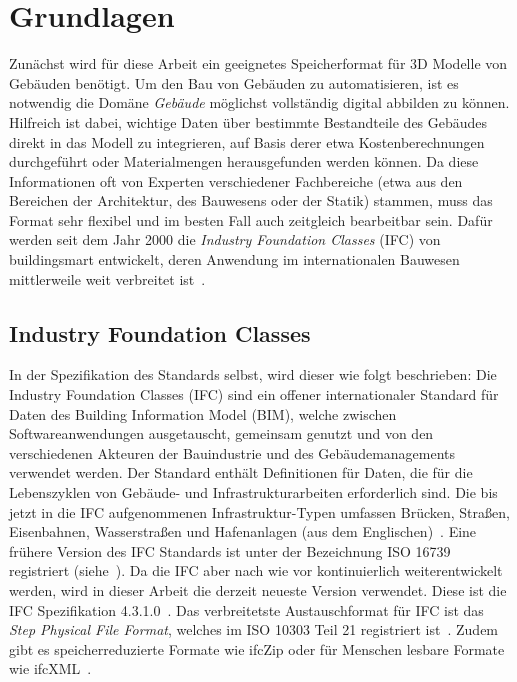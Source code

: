 
\chapter{Grundlagen}\label{basics}
Zunächst wird für diese Arbeit ein geeignetes Speicherformat für 3D Modelle von Gebäuden benötigt.
Um den Bau von Gebäuden zu automatisieren, ist es notwendig die Domäne \textit{Gebäude} möglichst vollständig digital abbilden zu können. 
Hilfreich ist dabei, wichtige Daten über bestimmte Bestandteile des Gebäudes direkt in das Modell zu integrieren, auf Basis derer etwa Kostenberechnungen durchgeführt oder Materialmengen herausgefunden werden können.
Da diese Informationen oft von Experten verschiedener Fachbereiche (etwa aus den Bereichen der Architektur, des Bauwesens oder der Statik) stammen, muss das Format sehr flexibel und im besten Fall auch zeitgleich bearbeitbar sein.
Dafür werden seit dem Jahr 2000 die \textit{Industry Foundation Classes} (IFC) von buildingsmart entwickelt, deren Anwendung im internationalen Bauwesen mittlerweile weit verbreitet ist~\cite{Industry61:online}.


\section{Industry Foundation Classes}\label{basics:ifc}
In der Spezifikation des Standards selbst, wird dieser wie folgt beschrieben:
\glqq{}Die Industry Foundation Classes (IFC) sind ein offener internationaler Standard für Daten des Building Information Model (BIM), welche zwischen Softwareanwendungen ausgetauscht, gemeinsam genutzt und von den verschiedenen Akteuren der Bauindustrie und des Gebäudemanagements verwendet werden. 
Der Standard enthält Definitionen für Daten, die für die Lebenszyklen von Gebäude- und Infrastrukturarbeiten erforderlich sind. 
Die bis jetzt in die IFC aufgenommenen Infrastruktur-Typen umfassen Brücken, Straßen, Eisenbahnen, Wasserstraßen und Hafenanlagen\grqq{} (aus dem Englischen)~\cite{IFCScope:online}. 
Eine frühere Version des IFC Standards ist unter der Bezeichnung ISO 16739 registriert (siehe~\cite{ISOISO1694:online}).
Da die IFC aber nach wie vor kontinuierlich weiterentwickelt werden, wird in dieser Arbeit die derzeit neueste Version verwendet.
Diese ist die IFC Spezifikation 4.3.1.0~\cite{IFC4310Spezification:online}.
Das verbreitetste Austauschformat für IFC ist das \textit{Step Physical File Format}, welches im ISO 10303 Teil 21 registriert ist~\cite{ISO_Step:online}.
Zudem gibt es speicherreduzierte Formate wie ifcZip oder für Menschen lesbare Formate wie ifcXML~\cite{Industry93:online}\cite{IFCForma28:online}\cite{BIM_handbook_AEC_XML_SCHEMAS}.

